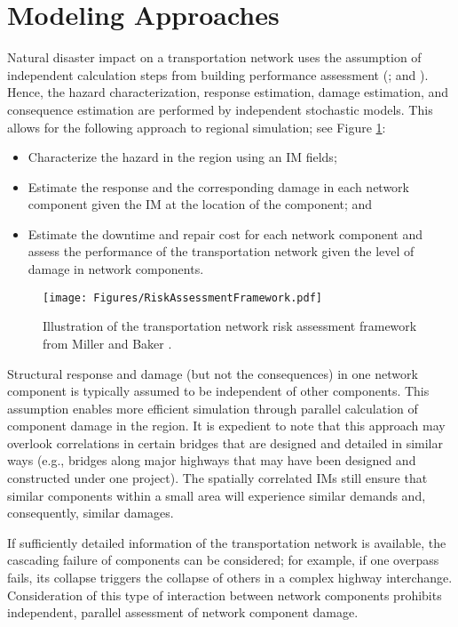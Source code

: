 \section{Modeling Approaches}
\label{sec:perf_transport_methods}

Natural disaster impact on a transportation network uses the assumption of independent calculation steps from building performance assessment (\cite{chang2000transportation, kiremidjian2006pacific}; and \cite{miller2015ground}). Hence, the hazard characterization, response estimation, damage estimation, and consequence estimation are performed by independent stochastic models. This allows for the following approach to regional simulation; see Figure \ref{fig:perf_TranspFramework}:

\begin{itemize}
    \item Characterize the hazard in the region using an IM fields;
    \item Estimate the response and the corresponding damage in each network component given the IM at the location of the component; and
    \item Estimate the downtime and repair cost for each network component and assess the performance of the transportation network given the level of damage in network components.
\end{itemize}

\begin{figure}[htb]
    \centering
    \texttt{[image: Figures/RiskAssessmentFramework.pdf]}
    \caption{Illustration of the transportation network risk assessment framework from Miller and Baker \cite{miller2015estimating}.}
    \label{fig:perf_TranspFramework}
\end{figure}

Structural response and damage (but not the consequences) in one network component is typically assumed to be independent of other components. This assumption enables more efficient simulation through parallel calculation of component damage in the region. It is expedient to note that this approach may overlook correlations in certain bridges that are designed and detailed in similar ways (e.g., bridges along major highways that may have been designed and constructed under one project). The spatially correlated IMs still ensure that similar components within a small area will experience similar demands and, consequently, similar damages.

If sufficiently detailed information of the transportation network is available, the cascading failure of components can be considered; for example, if one overpass fails, its collapse triggers the collapse of others in a complex highway interchange. Consideration of this type of interaction between network components prohibits independent, parallel assessment of network component damage.

